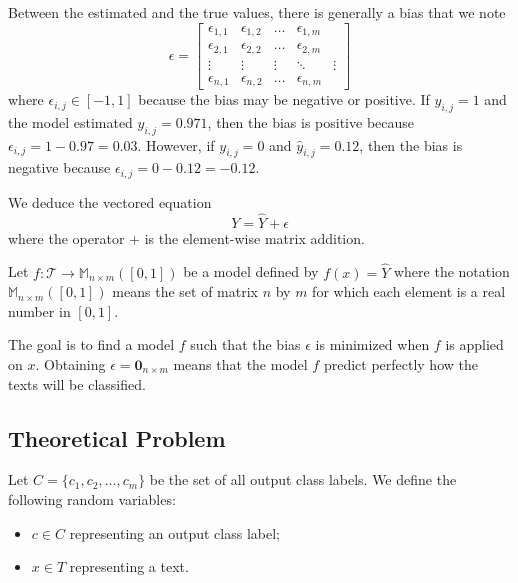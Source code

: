 \documentclass{article}
\begin{document}
Between the estimated and the true values, there is generally a bias that we note
\begin{equation} \label{eq:BiasMatrix}
\epsilon =\begin{bmatrix}
	    \epsilon_{1,1}      & \epsilon_{1,2}      & \ldots & \epsilon_{1,m} \\
	    \epsilon_{2,1} & \epsilon_{2,2} & \ldots & \epsilon_{2,m} \\
	    \vdots       & \vdots       & \vdots        & \ddots & \vdots \\
	    \epsilon_{n,1}  & \epsilon_{n,2}  & \ldots & \epsilon_{n,m}
	\end{bmatrix}
\end{equation}
where $\epsilon_{i,j} \in [-1, 1]$ because the bias may be negative or positive. If $y_{i,j} = 1$ and the model estimated $\widehat{y}_{i,j} = 0.971$, then the bias is positive because $\epsilon_{i,j} = 1 - 0.97 = 0.03$. However, if $y_{i,j} = 0$ and $\widehat{y}_{i,j} = 0.12$, then the bias is negative because $\epsilon_{i,j} = 0 - 0.12 = -0.12$.

We deduce the vectored equation 
\begin{equation}
	Y = \widehat{Y} + \epsilon
\end{equation}
where the operator $+$ is the element-wise matrix addition.

Let $f : \mathcal{T} \longrightarrow \mathbb{M}_{n \times m}([0,1])$ be a model defined by $f(x) = \widehat{Y}$ where the notation $\mathbb{M}_{n \times m}([0,1])$ means the set of matrix $n$ by $m$ for which each element is a real number in $[0,1]$.

The goal is to find a model $f$ such that the bias $\epsilon$ is minimized when $f$ is applied on $x$. Obtaining $\epsilon = \mathbf{0}_{n \times m}$ means that the model $f$ predict perfectly how the texts will be classified.


\subsection{Theoretical Problem}
Let $C = \{c_1,c_2,\ldots, c_m\}$ be the set of all output class labels. We define the following random variables:
\begin{itemize}
	\item $c \in C$ representing an output class label;
	\item $x \in T$ representing a text.
\end{itemize}
\end{document}

